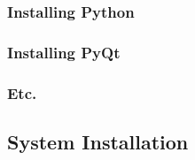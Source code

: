 \subsubsection{Installing Python}

\subsubsection{Installing PyQt}

\subsubsection{Etc.}

\subsection{System Installation}
